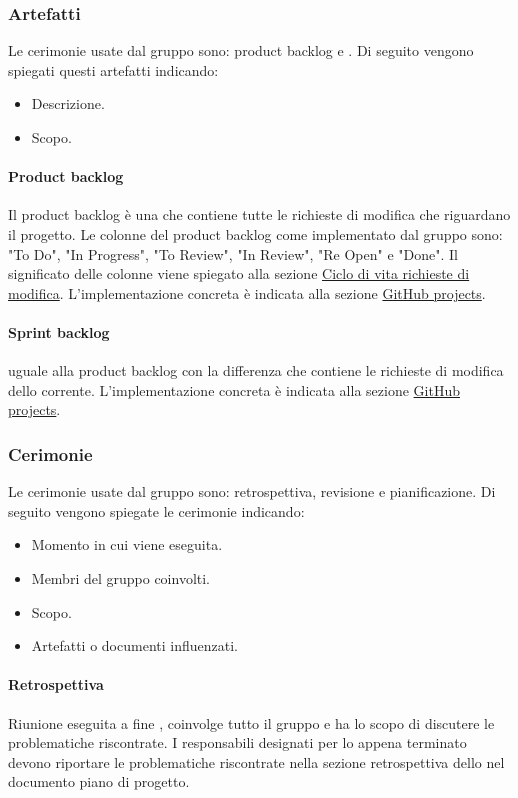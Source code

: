 \subsubsection{Artefatti}
Le cerimonie usate dal gruppo sono: product backlog e . 
Di seguito vengono spiegati questi artefatti indicando:
\begin{itemize}
    \item Descrizione.
    \item Scopo.
\end{itemize}

\paragraph{Product backlog}
Il product backlog è una  che contiene tutte le richieste di modifica che riguardano il progetto.
Le colonne del product backlog come implementato dal gruppo sono: "To Do", "In Progress", "To Review", "In Review", "Re Open" e "Done".
Il significato delle colonne viene spiegato alla sezione \hyperref[par:ciclo_vita_richieste_di_modifica]{Ciclo di vita richieste di modifica}.
L'implementazione concreta è indicata alla sezione \hyperref[subpar:project]{GitHub projects}.

\paragraph{Sprint backlog}
 uguale alla product backlog con la differenza che contiene le richieste di modifica dello  corrente.
L'implementazione concreta è indicata alla sezione \hyperref[subpar:project]{GitHub projects}.

\subsubsection{Cerimonie}
Le cerimonie usate dal gruppo sono: retrospettiva, revisione e pianificazione. 
Di seguito vengono spiegate le cerimonie indicando:
\begin{itemize}
    \item Momento in cui viene eseguita.
    \item Membri del gruppo coinvolti.
    \item Scopo.
    \item Artefatti o documenti influenzati.
\end{itemize}

\paragraph{Retrospettiva}
Riunione eseguita a fine , coinvolge tutto il gruppo e ha lo scopo di discutere le problematiche riscontrate.
I responsabili designati per lo  appena terminato devono riportare le problematiche riscontrate nella sezione retrospettiva dello  nel documento piano di progetto.


